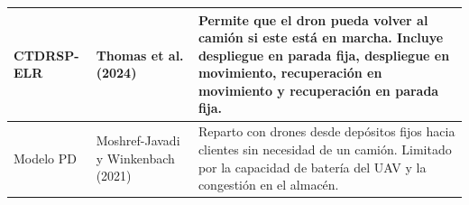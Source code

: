 \begin{table}[H]
\begin{tabular}{p{3.2cm}p{2.8cm}p{8.0cm}}
\hline
CTDRSP-ELR & Thomas et al. (2024) \cite{thomas2024collaborative} & Permite que el dron pueda volver al camión si este está en marcha. Incluye despliegue en parada fija, despliegue en movimiento, recuperación en movimiento y recuperación en parada fija. \\
\hline
Modelo PD & Moshref-Javadi y Winkenbach (2021) \cite{moshrefjavadi2021applications} & Reparto con drones desde depósitos fijos hacia clientes sin necesidad de un camión. Limitado por la capacidad de batería del UAV y la congestión en el almacén. \\
\hline
\end{tabular}
\end{table}
